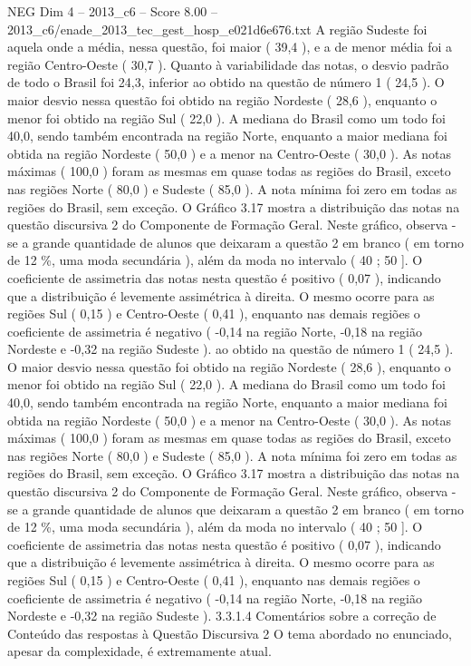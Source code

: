 \begin{textsample}{NEG Dim 4 – 2013\_c6 – Score 8.00 – 2013\_c6/enade\_2013\_tec\_gest\_hosp\_e021d6e676.txt}
A região Sudeste foi aquela onde a média, nessa questão, foi maior ( 39,4 ), e a de menor média foi a região Centro-Oeste ( 30,7 ).
Quanto à variabilidade das notas, o desvio padrão de todo o Brasil foi 24,3, inferior ao obtido na questão de número 1 ( 24,5 ).
O maior desvio nessa questão foi obtido na região Nordeste ( 28,6 ), enquanto o menor foi obtido na região Sul ( 22,0 ).
A mediana do Brasil como um todo foi 40,0, sendo também encontrada na região Norte, enquanto a maior mediana foi obtida na região Nordeste ( 50,0 ) e a menor na Centro-Oeste ( 30,0 ).
As notas máximas ( 100,0 ) foram as mesmas em quase todas as regiões do Brasil, exceto nas regiões Norte ( 80,0 ) e Sudeste ( 85,0 ).
A nota mínima foi zero em todas as regiões do Brasil, sem exceção.
O Gráfico 3.17 mostra a distribuição das notas na questão discursiva 2 do Componente de Formação Geral.
Neste gráfico, observa -se a grande quantidade de alunos que deixaram a questão 2 em branco ( em torno de 12 \%, uma moda secundária ), além da moda no intervalo ( 40 ; 50 ].
O coeficiente de assimetria das notas nesta questão é positivo ( 0,07 ), indicando que a distribuição é levemente assimétrica à direita.
O mesmo ocorre para as regiões Sul ( 0,15 ) e Centro-Oeste ( 0,41 ), enquanto nas demais regiões o coeficiente de assimetria é negativo ( -0,14 na região Norte, -0,18 na região Nordeste e -0,32 na região Sudeste ). ao obtido na questão de número 1 ( 24,5 ).
O maior desvio nessa questão foi obtido na região Nordeste ( 28,6 ), enquanto o menor foi obtido na região Sul ( 22,0 ).
A mediana do Brasil como um todo foi 40,0, sendo também encontrada na região Norte, enquanto a maior mediana foi obtida na região Nordeste ( 50,0 ) e a menor na Centro-Oeste ( 30,0 ).
As notas máximas ( 100,0 ) foram as mesmas em quase todas as regiões do Brasil, exceto nas regiões Norte ( 80,0 ) e Sudeste ( 85,0 ).
A nota mínima foi zero em todas as regiões do Brasil, sem exceção.
O Gráfico 3.17 mostra a distribuição das notas na questão discursiva 2 do Componente de Formação Geral.
Neste gráfico, observa -se a grande quantidade de alunos que deixaram a questão 2 em branco ( em torno de 12 \%, uma moda secundária ), além da moda no intervalo ( 40 ; 50 ].
O coeficiente de assimetria das notas nesta questão é positivo ( 0,07 ), indicando que a distribuição é levemente assimétrica à direita.
O mesmo ocorre para as regiões Sul ( 0,15 ) e Centro-Oeste ( 0,41 ), enquanto nas demais regiões o coeficiente de assimetria é negativo ( -0,14 na região Norte, -0,18 na região Nordeste e -0,32 na região Sudeste ). 3.3.1.4 Comentários sobre a correção de Conteúdo das respostas à Questão Discursiva 2 O tema abordado no enunciado, apesar da complexidade, é extremamente atual.

\end{textsample}
